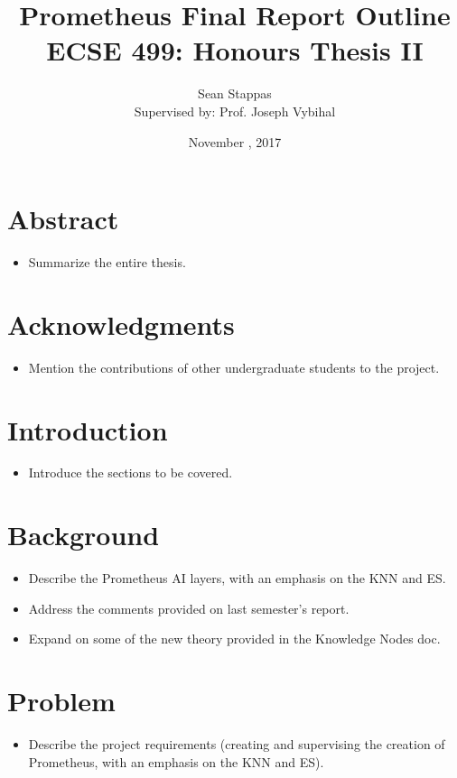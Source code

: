 \documentclass[11pt]{article}
\title
{
	\Large\textbf{Prometheus Final Report Outline} \\ 
	\large ECSE 499: Honours Thesis II
}
\author %
{
	Sean Stappas \\
	\small Supervised by: Prof. Joseph Vybihal
}
\date{November \nth{10}, 2017}
\begin{document}
	
\sloppy

\twocolumn
\maketitle

\section*{Abstract}
\begin{itemize}
	\item Summarize the entire thesis.
\end{itemize}

\section*{Acknowledgments}
\begin{itemize}
	\item Mention the contributions of other undergraduate students to the project.
\end{itemize}

\section{Introduction}
\begin{itemize}
	\item Introduce the sections to be covered.
\end{itemize}

\section{Background}
\begin{itemize}
	\item Describe the Prometheus AI layers, with an emphasis on the KNN and ES.
	\item Address the comments provided on last semester's report.
	\item Expand on some of the new theory provided in the Knowledge Nodes doc.
\end{itemize}

\section{Problem}
\begin{itemize}
	\item Describe the project requirements (creating and supervising the creation of Prometheus, with an emphasis on the KNN and ES).
\end{itemize}
\end{document}
